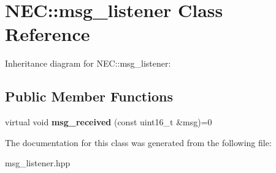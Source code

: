 \hypertarget{classNEC_1_1msg__listener}{}\section{N\+EC\+:\+:msg\+\_\+listener Class Reference}
\label{classNEC_1_1msg__listener}


Inheritance diagram for N\+EC\+:\+:msg\+\_\+listener\+:
\subsection*{Public Member Functions}
\begin{DoxyCompactItemize}
\item 
\mbox{\label{classNEC_1_1msg__listener_a859a0340c91b7040b3bbad2125730e01}} 
virtual void {\bfseries msg\+\_\+received} (const uint16\+\_\+t \&msg)=0
\end{DoxyCompactItemize}


The documentation for this class was generated from the following file\+:\begin{DoxyCompactItemize}
\item 
msg\+\_\+listener.\+hpp\end{DoxyCompactItemize}
